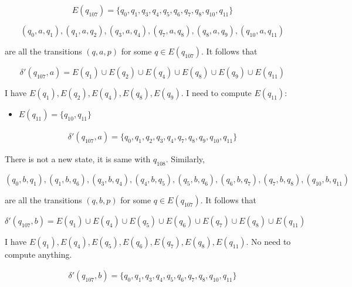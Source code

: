 \begin{equation*}
    E(q_{107}) = \{ q_{0}, q_{1}, q_{3}, q_{4}, q_{5}, q_{6}, q_{7}, q_{8}, q_{10}, q_{11} \}
\end{equation*}

\begin{equation*}
    (q_{0}, a, q_{1}), (q_{1}, a, q_{2}), (q_{3}, a, q_{4}), (q_{7}, a, q_{8}), (q_{8}, a, q_{9}), (q_{10}, a, q_{11})
\end{equation*}

\noindent are all the transitions $(q, a, p)$ for some $q \in E(q_{107})$. It follows that

\begin{equation*}
    \delta'(q_{107}, a) = E(q_{1}) \cup E(q_{2}) \cup E(q_{4}) \cup E(q_{8}) \cup E(q_{9}) \cup E(q_{11})
\end{equation*}

\noindent I have $E(q_{1}), E(q_{2}), E(q_{4}), E(q_{8}), E(q_{9})$. I need to compute $E(q_{11})$:
\begin{itemize}
    \item $E(q_{11}) = \{ q_{10}, q_{11} \}$
\end{itemize}

\begin{align*}
    \delta'(q_{107}, a) = \{ q_{0}, q_{1}, q_{2}, q_{3}, q_{4}, q_{7}, q_{8}, q_{9}, q_{10}, q_{11} \}
\end{align*}

\noindent There is not a new state, it is same with $q_{108}$. Similarly,

\begin{equation*}
    (q_{0}, b, q_{1}), (q_{1}, b, q_{6}), (q_{3}, b, q_{4}), (q_{4}, b, q_{5}), (q_{5}, b, q_{6}), (q_{6}, b, q_{7}), (q_{7}, b, q_{8}), (q_{10}, b, q_{11})
\end{equation*}

\noindent are all the transitions $(q, b, p)$ for some $q \in E(q_{107})$. It follows that

\begin{equation*}
    \delta'(q_{107}, b) = E(q_{1}) \cup E(q_{4}) \cup E(q_{5}) \cup E(q_{6}) \cup E(q_{7}) \cup E(q_{8}) \cup E(q_{11})
\end{equation*}

\noindent I have $E(q_{1}), E(q_{4}), E(q_{5}), E(q_{6}), E(q_{7}), E(q_{8}), E(q_{11})$. No need to compute anything.

\begin{align*}
    \delta'(q_{107}, b) = \{ q_{0}, q_{1}, q_{3}, q_{4}, q_{5}, q_{6}, q_{7}, q_{8}, q_{10}, q_{11} \}
\end{align*}

